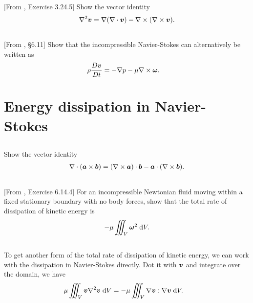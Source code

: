 \documentclass[11pt,letterpaper]{article}
\begin{document}
\subsection{}
[From \cite{Aris_62}, Exercise 3.24.5] Show the vector identity
\begin{align}
    \nabla^2 \boldsymbol{v} = \nabla(\nabla\cdot\boldsymbol{v})-\nabla\times(\nabla\times \boldsymbol{v}).
\end{align}

\subsection{}
[From \cite{Aris_62}, \S 6.11] Show that the incompressible Navier-Stokes can alternatively be written as
\begin{align}
    \rho\frac{D\boldsymbol{v}}{Dt} &= -\nabla p-\mu\nabla\times\boldsymbol{\omega}.
\end{align}

\newpage
\section{Energy dissipation in Navier-Stokes}
\subsection{}
Show the vector identity
\begin{align}
    \nabla\cdot(\boldsymbol{a}\times\boldsymbol{b}) = (\nabla\times\boldsymbol{a})\cdot\boldsymbol{b}-\boldsymbol{a}\cdot(\nabla\times\boldsymbol{b}).
\end{align}

\subsection{}
[From \cite{Aris_62}, Exercise 6.14.4] For an incompressible Newtonian fluid moving within a fixed stationary boundary with no body forces, show that the total rate of dissipation of kinetic energy is
\begin{align}
    -\mu \iiint_V \boldsymbol{\omega}^2 \;\mathrm{d} V.
\end{align}

\subsection{}
To get another form of the total rate of dissipation of kinetic energy, we can work with the dissipation in Navier-Stokes directly. Dot it with $\boldsymbol{v}$ and integrate over the domain, we have
\begin{align}
    \mu \iiint_V \boldsymbol{v}\nabla^2\boldsymbol{v} \;\mathrm{d} V &= -\mu \iiint_V \nabla \boldsymbol{v}:\nabla\boldsymbol{v} \;\mathrm{d} V.
\end{align}
\end{document}
